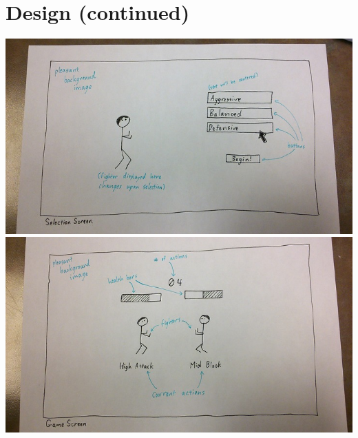 \documentclass{article}
\begin{document}
\section*{Design (continued)}
\includegraphics[scale=0.3]{design/selectionscreen.png}\\
\includegraphics[scale=0.3]{design/gamescreen.png}
\end{document}
